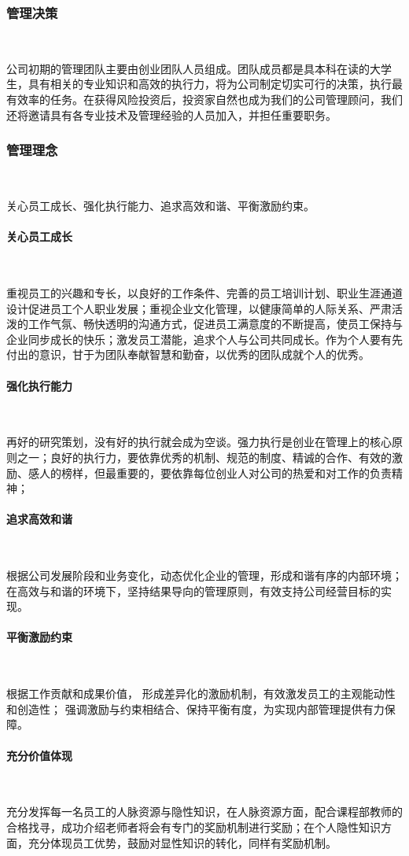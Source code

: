 \subsubsection{管理决策}\

公司初期的管理团队主要由创业团队人员组成。团队成员都是具本科在读的大学生，具有相关的专业知识和高效的执行力，将为公司制定切实可行的决策，执行最有效率的任务。在获得风险投资后，投资家自然也成为我们的公司管理顾问，我们还将邀请具有各专业技术及管理经验的人员加入，并担任重要职务。

\subsubsection{管理理念}\

关心员工成长、强化执行能力、追求高效和谐、平衡激励约束。

\paragraph{关心员工成长}\

重视员工的兴趣和专长，以良好的工作条件、完善的员工培训计划、职业生涯通道设计促进员工个人职业发展；重视企业文化管理，以健康简单的人际关系、严肃活泼的工作气氛、畅快透明的沟通方式，促进员工满意度的不断提高，使员工保持与企业同步成长的快乐；激发员工潜能，追求个人与公司共同成长。作为个人要有先付出的意识，甘于为团队奉献智慧和勤奋，以优秀的团队成就个人的优秀。
\paragraph{强化执行能力}\

再好的研究策划，没有好的执行就会成为空谈。强力执行是创业在管理上的核心原则之一；良好的执行力，要依靠优秀的机制、规范的制度、精诚的合作、有效的激励、感人的榜样，但最重要的，要依靠每位创业人对公司的热爱和对工作的负责精神；
\paragraph{追求高效和谐}\

根据公司发展阶段和业务变化，动态优化企业的管理，形成和谐有序的内部环境；在高效与和谐的环境下，坚持结果导向的管理原则，有效支持公司经营目标的实现。
\paragraph{平衡激励约束}\

根据工作贡献和成果价值， 形成差异化的激励机制，有效激发员工的主观能动性和创造性； 强调激励与约束相结合、保持平衡有度，为实现内部管理提供有力保障。

\paragraph{充分价值体现}\

充分发挥每一名员工的人脉资源与隐性知识，在人脉资源方面，配合课程部教师的合格找寻，成功介绍老师者将会有专门的奖励机制进行奖励；在个人隐性知识方面，充分体现员工优势，鼓励对显性知识的转化，同样有奖励机制。





